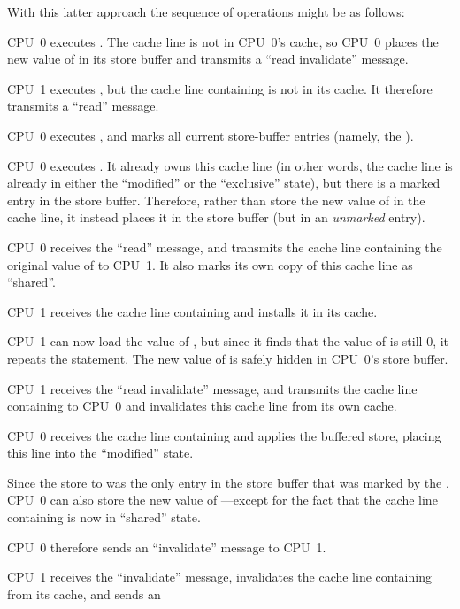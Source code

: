 With this latter approach the sequence of operations might be as follows:
\begin{sequence}
\item	CPU~0 executes .  The cache line is not in
	CPU~0's cache, so CPU~0 places the new value of  in its
	store buffer and transmits a ``read invalidate'' message.
\item	CPU~1 executes , but the cache line
	containing  is not in its cache.
	It therefore transmits a ``read'' message.
\item	CPU~0 executes , and marks all current store-buffer
	entries (namely, the ).
\item	CPU~0 executes .
	It already owns this cache line (in other words, the cache line
	is already in either the ``modified'' or the ``exclusive'' state),
	but there is a marked entry in the store buffer.
	Therefore, rather than store the new value of  in the
	cache line, it instead places it in the store buffer (but
	in an \emph{unmarked} entry).
\item	CPU~0 receives the ``read'' message, and transmits the
	cache line containing the original value of 
	to CPU~1.
	It also marks its own copy of this cache line as ``shared''.
\item	CPU~1 receives the cache line containing  and installs
	it in its cache.
\item	CPU~1 can now load the value of ,
	but since it finds that the value of  is still 0, it repeats
	the  statement.
	The new value of  is safely hidden in CPU~0's store buffer.
\item	CPU~1 receives the ``read invalidate'' message, and
	transmits the cache line containing  to CPU~0 and
	invalidates this cache line from its own cache.
\item	CPU~0 receives the cache line containing  and applies
	the buffered store, placing this line into the ``modified''
	state.
\item	Since the store to  was the only
	entry in the store buffer that was marked by the ,
	CPU~0 can also store the new value of ---except for the
	fact that the cache line containing  is now in ``shared''
	state.
\item	CPU~0 therefore sends an ``invalidate'' message to CPU~1.
\item	CPU~1 receives the ``invalidate'' message, invalidates the
	cache line containing  from its cache, and sends an

\end{sequence}

